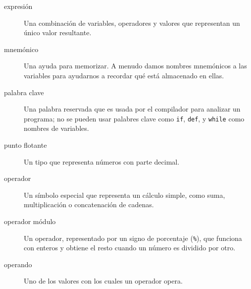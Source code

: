 
\begin{description}
\item[expresión]
Una combinación de variables, operadores y valores que representan un
único valor resultante.
\end{description}


\begin{description}
\item[mnemónico]
Una ayuda para memorizar. A menudo damos nombres mnemónicos a las
variables para ayudarnos a recordar qué está almacenado en ellas.
\end{description}


\begin{description}
\item[palabra clave]
Una palabra reservada que es usada por el compilador para analizar un
programa; no se pueden usar palabres clave como \texttt{if},
\texttt{def}, y \texttt{while} como nombres de variables.
\end{description}


\begin{description}
\item[punto flotante]
Un tipo que representa números con parte decimal.
\end{description}


\begin{description}
\item[operador]
Un símbolo especial que representa un cálculo simple, como suma,
multiplicación o concatenación de cadenas.
\end{description}


\begin{description}
\item[operador módulo]
Un operador, representado por un signo de porcentaje (\texttt{\%}), que
funciona con enteros y obtiene el resto cuando un número es dividido por
otro.
\end{description}

 

\begin{description}
\item[operando]
Uno de los valores con los cuales un operador opera.
\end{description}

